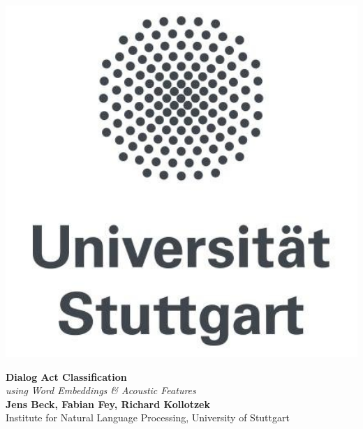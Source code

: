 \documentclass[a0,landscape]{a0poster}
\begin{document}
	\selectfont



\begin{minipage}[b]{0.20\linewidth}
	\centering\includegraphics[width=15cm]{Bilder/logo_UniStuttgart.jpg} %
\end{minipage}
%
\begin{minipage}[b]{0.60\linewidth}
	\veryHuge \centering\color{DodgerBlue} \textbf{Dialog Act Classification}\\ %
	\Huge\textit{using Word Embeddings \& Acoustic Features} \color{Black}\\[1cm] %
	\huge \textbf{Jens Beck, Fabian Fey, Richard Kollotzek}\\ %
	\huge Institute for Natural Language Processing, University of Stuttgart\\ %
\end{minipage}
\end{document}

